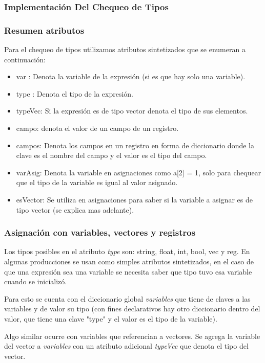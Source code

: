 \subsubsection{Implementación Del Chequeo de Tipos}

\subsubsection{Resumen atributos}

Para el chequeo de tipos utilizamos atributos sintetizados que se enumeran a continuación:

\begin{itemize}
\item var : Denota la variable de la expresión (si es que hay solo una variable).
\item type : Denota el tipo de la expresión.
\item typeVec: Si la expresión es de tipo vector denota el tipo de sus elementos.
\item campo: denota el valor de un campo de un registro.
\item campos: Denota los campos en un registro en forma de diccionario donde la clave es el nombre del campo y el valor es el tipo del campo.
\item varAsig: Denota la variable en asignaciones como a[2] = 1, solo para chequear que el tipo de la variable es igual al valor asignado.
\item esVector: Se utiliza en asignaciones para saber si la variable a asignar es de tipo vector (se explica mas adelante).
\end{itemize}

\subsubsection{Asignación con variables, vectores y registros}
Los tipos posibles en el atributo \textit{type} son: string, float, int, bool, vec y reg. En algunas producciones se usan como simples atributos sintetizados, en el caso de que una expresión sea una variable se necesita saber que tipo tuvo esa variable cuando se inicializó. 

Para esto se cuenta con el diccionario global \textit{variables} que tiene de claves a las variables y de valor su tipo (con fines declarativos hay otro diccionario dentro del valor, que tiene una clave "type" y el valor es el tipo de la variable).

Algo similar ocurre con variables que referencian a  vectores. Se agrega la variable del vector a \textit{variables} con un atributo adicional \textit{typeVec} que denota el tipo del vector.

